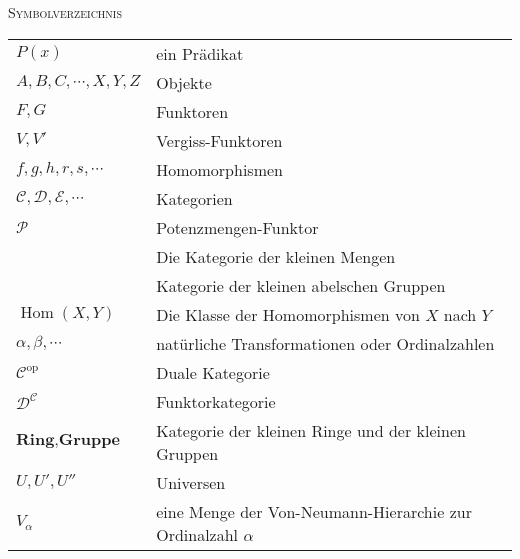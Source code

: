 \documentclass[a4paper]{amsart}
\theoremstyle{definition}
\DeclareMathOperator{\Hom}{Hom}
\newcommand{\CC}{\ensuremath{\mathcal{ C }}}
\newcommand{\DD}{\ensuremath{\mathcal{ D }}}
\newcommand{\PP}{\ensuremath{\mathcal{ P }}}
\newcommand{\Set}{\text{\textbf{Set}}}
\newcommand{\Ab}{\text{\textbf{Ab}}}
\begin{document}
\begin{large}
    \centerline{\textsc{Symbolverzeichnis}}
\end{large}
\bigskip

\renewcommand*{\arraystretch}{1}

\begin{tabular}{ll}
    $P(x)$                              & ein Prädikat\\
    $A, B, C, \cdots, X, Y, Z$          & Objekte\\
    $F,G$                               & Funktoren\\
    $V, V'$                             & Vergiss-Funktoren\\
    $f, g, h, r, s, \cdots$             & Homomorphismen\\
    $\mathcal C, \mathcal D, \mathcal E, \cdots$ & Kategorien\\
    $\PP$                               & Potenzmengen-Funktor\\
    \Set                                & Die Kategorie der kleinen Mengen\\
    \Ab                                 & Kategorie der kleinen abelschen Gruppen\\
    $\Hom( X, Y)$                       & Die Klasse der Homomorphismen von $X$ nach $Y$\\
    $\alpha, \beta, \cdots$             & natürliche Transformationen oder Ordinalzahlen\\
    $\mathcal C ^{\text{op}}$           & Duale Kategorie\\
    $\DD^\CC$                           & Funktorkategorie\\
    $\textbf{Ring}, \textbf{Gruppe}$    & Kategorie der kleinen Ringe und der kleinen Gruppen\\
    $U, U', U''$                        & Universen\\
    $V_\alpha$                          & eine Menge der Von-Neumann-Hierarchie zur Ordinalzahl
                                          $\alpha$

\end{tabular}
\end{document}
